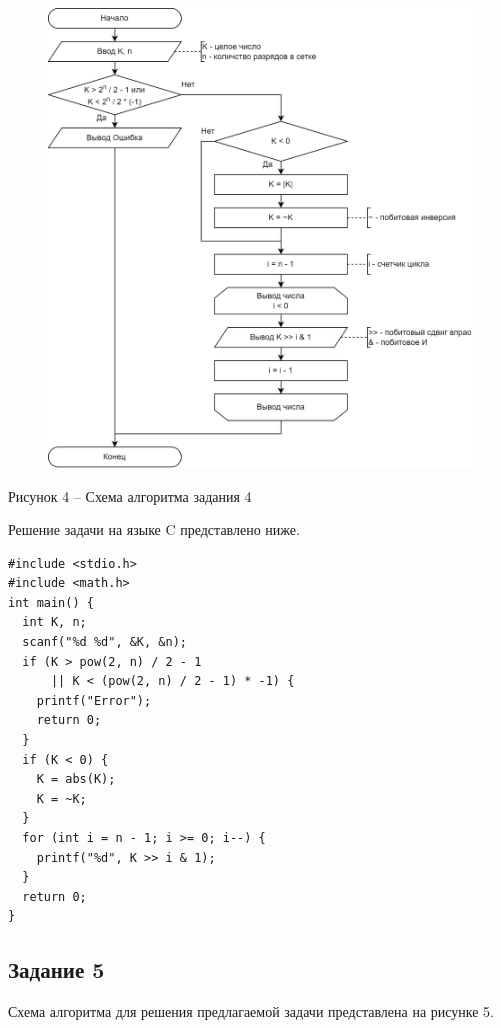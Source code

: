 \documentclass[a4paper,14pt]{extarticle}
\begin{document}
  \begin{figure}[h]
    \centering
    \includegraphics[width=0.8\linewidth]{schemes/s-4}
  \end{figure}
  \begin{center}
    Рисунок 4 – Схема алгоритма задания 4
  \end{center}
  \pagebreak

  Решение задачи на языке C представлено ниже.

  \begin{lstlisting}[tabsize=2,basicstyle=\ttfamily]
#include <stdio.h>
#include <math.h>
int main() {
  int K, n;
  scanf("%d %d", &K, &n);
  if (K > pow(2, n) / 2 - 1 
      || K < (pow(2, n) / 2 - 1) * -1) {
    printf("Error");
    return 0;
  }
  if (K < 0) {
    K = abs(K);
    K = ~K;
  }
  for (int i = n - 1; i >= 0; i--) {
    printf("%d", K >> i & 1);
  }
  return 0;
}
  \end{lstlisting}

  \pagebreak
  \subsection*{Задание 5}
  Схема алгоритма для решения предлагаемой задачи представлена на рисунке 5.
\end{document}

